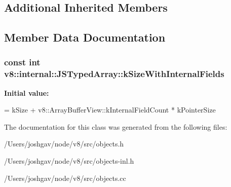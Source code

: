 \subsection*{Additional Inherited Members}


\subsection{Member Data Documentation}
\subsubsection[{\texorpdfstring{k\+Size\+With\+Internal\+Fields}{kSizeWithInternalFields}}]{\setlength{\rightskip}{0pt plus 5cm}const int v8\+::internal\+::\+J\+S\+Typed\+Array\+::k\+Size\+With\+Internal\+Fields\hspace{0.3cm}{\ttfamily [static]}}\hypertarget{classv8_1_1internal_1_1_j_s_typed_array_ab63cf4f45ce0038f5c65de5661778b40}{}\label{classv8_1_1internal_1_1_j_s_typed_array_ab63cf4f45ce0038f5c65de5661778b40}
{\bfseries Initial value\+:}
\begin{DoxyCode}
=
      kSize + v8::ArrayBufferView::kInternalFieldCount * kPointerSize
\end{DoxyCode}


The documentation for this class was generated from the following files\+:\begin{DoxyCompactItemize}
\item 
/\+Users/joshgav/node/v8/src/objects.\+h\item 
/\+Users/joshgav/node/v8/src/objects-\/inl.\+h\item 
/\+Users/joshgav/node/v8/src/objects.\+cc\end{DoxyCompactItemize}
